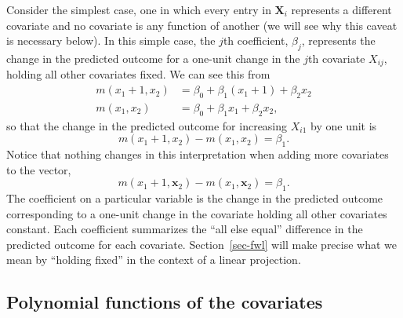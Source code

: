 \documentclass[
  13pt,
  letterpaper,
  DIV=11,
  numbers=noendperiod]{scrreprt}
\newcommand{\mb}{\bm}
\newcommand{\X}{\mb{X}}
\newcommand{\bfx}{\mb{x}}
\theoremstyle{plain}
\theoremstyle{plain}
\theoremstyle{definition}
\theoremstyle{definition}
\theoremstyle{remark}
\begin{document}
Consider the simplest case, one in which every entry in \(\X_{i}\)
represents a different covariate and no covariate is any function of
another (we will see why this caveat is necessary below). In this simple
case, the \(j\)th coefficient, \(\beta_{j}\), represents the change in
the predicted outcome for a one-unit change in the \(j\)th covariate
\(X_{ij}\), holding all other covariates fixed. We can see this from \[ 
\begin{aligned}
  m(x_{1} + 1, x_{2}) & = \beta_{0} + \beta_{1}(x_{1} + 1) + \beta_{2}x_{2} \\
  m(x_{1}, x_{2}) &= \beta_{0} + \beta_{1}x_{1} + \beta_{2}x_{2},
\end{aligned} 
\] so that the change in the predicted outcome for increasing \(X_{i1}\)
by one unit is \[
 m(x_{1} + 1, x_{2}) - m(x_{1}, x_{2}) = \beta_1.
\] Notice that nothing changes in this interpretation when adding more
covariates to the vector, \[
 m(x_{1} + 1, \bfx_{2}) - m(x_{1}, \bfx_{2}) = \beta_1.
\] The coefficient on a particular variable is the change in the
predicted outcome corresponding to a one-unit change in the covariate
holding all other covariates constant. Each coefficient summarizes the
``all else equal'' difference in the predicted outcome for each
covariate. Section~\ref{sec-fwl} will make precise what we mean by
``holding fixed'' in the context of a linear projection.

\subsection{Polynomial functions of the
covariates}\label{polynomial-functions-of-the-covariates}
\end{document}
